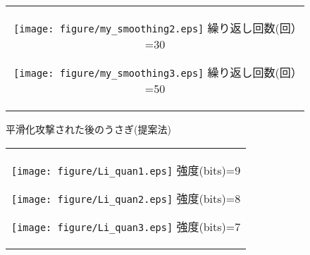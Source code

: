 \documentclass[11pt]{jreport}
\begin{document}
{\begin{figure}[htbp]
\begin{center}
\begin{tabular}{c}
      \begin{minipage}{0.33\hsize}
        \begin{center}
          \texttt{[image: figure/my\_smoothing2.eps]}
          \hspace{1.6cm} 繰り返し回数(回）=30
        \end{center}
      \end{minipage}

      \begin{minipage}{0.33\hsize}
        \begin{center}
          \texttt{[image: figure/my\_smoothing3.eps]}
          \hspace{1.6cm} 繰り返し回数(回）=50
        \end{center}
      \end{minipage}

    \end{tabular}
    \caption{平滑化攻撃された後のうさぎ(提案法)}
    \label{fig:smoothing1}
  \end{center}
\end{figure}


\begin{figure}[htbp]
  \begin{center}
    \begin{tabular}{c}

      \begin{minipage}{0.33\hsize}
        \begin{center}
          \texttt{[image: figure/Li\_quan1.eps]}
          \hspace{1.6cm} 強度(bits)=9
        \end{center}
      \end{minipage}

      \begin{minipage}{0.33\hsize}
        \begin{center}
          \texttt{[image: figure/Li\_quan2.eps]}
          \hspace{1.6cm} 強度(bits)=8
        \end{center}
      \end{minipage}

      \begin{minipage}{0.33\hsize}
        \begin{center}
          \texttt{[image: figure/Li\_quan3.eps]}
          \hspace{1.6cm} 強度(bits)=7
        \end{center}
      \end{minipage}


\end{tabular}
\end{center}
\end{figure}}
\end{document}
